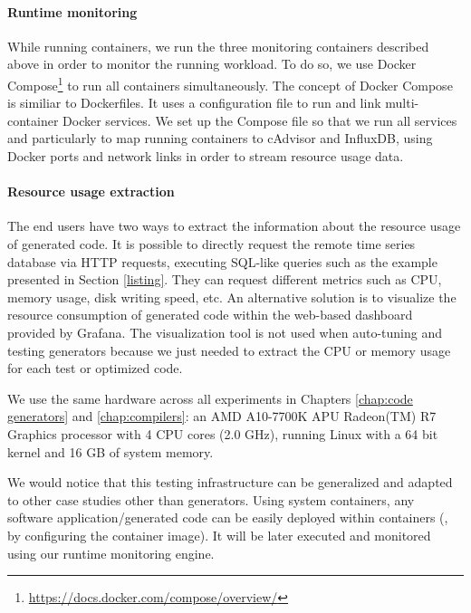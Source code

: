 \paragraph{Runtime monitoring}
While running containers, we run the three monitoring containers described above in order to monitor the running workload. To do so, we use Docker Compose\footnote{\url{https://docs.docker.com/compose/overview/}} to run all containers simultaneously. The concept of Docker Compose is similiar to Dockerfiles. It uses a configuration file to run and link multi-container Docker services. We set up the Compose file so that we run all services and particularly to map running containers to cAdvisor and InfluxDB, using Docker ports and network links in order to stream resource usage data.

\paragraph{Resource usage extraction}
The end users have two ways to extract the information about the resource usage of generated code. It is possible to directly request the remote time series database via HTTP requests, executing SQL-like queries such as the example presented in Section \ref{listing}. They can request different metrics such as CPU, memory usage, disk writing speed, etc. An alternative solution is to visualize the resource consumption of generated code within the web-based dashboard provided by Grafana. The visualization tool is not used when auto-tuning and testing generators because we just needed to extract the CPU or memory usage for each test or optimized code. 

We use the same hardware across all experiments in Chapters \ref{chap:code generators} and \ref{chap:compilers}: an AMD A10-7700K APU Radeon(TM) R7 Graphics processor with 4 CPU cores (2.0 GHz), running Linux with a 64 bit kernel and 16 GB of system memory.	



\begin{remark}
	We would notice that this testing infrastructure can be generalized and adapted to other case studies other than generators. Using system containers, any software application/generated code can be easily deployed within containers (\ie, by configuring the container image). It will be later executed and monitored using our runtime monitoring engine. 
\end{remark}

